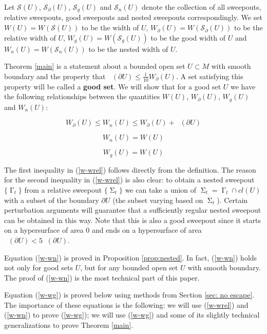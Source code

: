 \documentclass[12pt]{amsart}
\DeclareMathOperator{\Hn}{\mathcal{H}^n}
\DeclareMathOperator{\G}{\Gamma}
\DeclareMathOperator{\Si}{\Sigma}
\newcommand{\Cgs}{5 \Hn(\partial U)}
\theoremstyle{definition}
\begin{document}
Let $\mathcal{S}(U)$, $\mathcal{S}_{\partial}(U)$, $\mathcal{S}_g(U)$ and $\mathcal{S}_n(U)$
denote the collection of all sweepouts, relative sweepouts, good sweepouts
and nested sweepouts correspondingly.
We set $W(U)=W(\mathcal{S}(U))$ to be the width of $U$,
$W_{\partial}(U)=W(\mathcal{S}_{\partial}(U))$ to be the relative width of $U$,
$W_g(U)=W(\mathcal{S}_g(U))$ to be the good width of $U$ and
$W_n(U)=W(\mathcal{S}_n(U))$ to be the nested width of $U$.


Theorem \ref*{main} is a statement about a bounded open set $U \subset M$
with smooth boundary and the property that $\Hn (\partial U ) \leq \frac{1}{10} W_{\partial}(U)$.
A set satisfying this property will be called a \textbf{good set}.
We will show that for a good set $U$
we have the following relationships
between the quantities $W(U)$, $W_{\partial}(U)$,
$W_g(U)$ and $W_n(U)$:


\begin{equation} \label{w-wrel}
    W_{\partial}(U) \leq W_n(U) \leq W_{\partial}(U) + \Hn(\partial U)
\end{equation}

\begin{equation} \label{w-wn}
    W_n(U) = W(U)
\end{equation}

\begin{equation} \label{w-wg}
    W_g(U) = W(U)
\end{equation}


The first inequality in (\ref*{w-wrel}) follows
directly from the definition.
The reason for the second inequality in (\ref*{w-wrel})
is also clear:
to obtain a nested sweepout $\{\G_t \}$
from a relative sweepout $\{\Si_t \}$
we can take a union of $\Si_t = \G_t \cap cl(U)$
with a subset of the boundary $\partial U$ (the subset varying based on $\Si_t$).
Certain perturbation arguments will guarantee 
that a sufficiently regular nested sweepout can 
be obtained in this way.
Note that this is also a good sweepout
since it starts on a hypersurface
of area $0$ and ends on a hypersurface of 
area $\Hn(\partial U) < \Cgs$.

Equation (\ref*{w-wn}) is proved in Proposition \ref*{prop:nested}.
In fact, (\ref*{w-wn}) holds not only for good sets $U$,
but for any bounded open set $U$ with smooth 
boundary. 
The proof of (\ref*{w-wn}) is the most technical 
part of this paper.

Equation (\ref*{w-wg}) is proved below using methods from
Section \ref*{sec: no escape}.
The importance of these equations is the following:
we will use (\ref*{w-wrel})
 and (\ref*{w-wn}) to prove (\ref*{w-wg});
 we will use (\ref*{w-wg}) and some of its slightly technical generalizations to prove
Theorem \ref*{main}.
\end{document}

